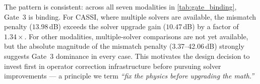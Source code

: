 \noindent
The pattern is consistent: across all seven modalities in
\cref{tab:gate_binding}, Gate~3 is binding.  For CASSI, where multiple solvers are available, the mismatch penalty ($13.98$\,dB) exceeds the solver upgrade gain ($10.47$\,dB) by a factor of $1.34\times$.  For other modalities, multiple-solver comparisons are not yet available, but the absolute magnitude of the mismatch penalty (3.37--42.06\,dB) strongly suggests Gate~3 dominance in every case.  This motivates the \pwm{}
design decision to invest first in operator correction infrastructure
before pursuing solver improvements --- a principle we term
\emph{``fix the physics before upgrading the math.''}
